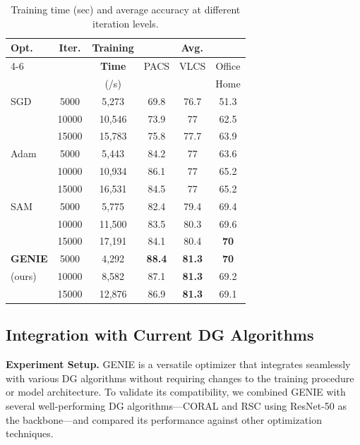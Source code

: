 \documentclass{article}
\theoremstyle{plain}
\theoremstyle{definition}
\theoremstyle{remark}
\begin{document}
\vskip -0.2in
\begin{table}[ht]
\vskip 0.1in
\caption{Training time (sec) and average accuracy at different iteration levels. }
\label{tab:iteration_opt}

\begin{center}
\begin{scriptsize}
\begin{sc}
\begin{tabular}{lc|c|ccc}
\toprule
\textbf{Opt.}& \textbf{Iter.}& \textbf{Training} & \multicolumn{3}{c}{\textbf{Avg.}}\\
\cmidrule(lr){4-6}& & \textbf{Time} & PACS & VLCS & Office\\ 
& & (/s) && & Home\\ 
\midrule
SGD     & 5000     & 5,273 & 69.8& 76.7& 51.3\\
        & 10000    & 10,546& 73.9& 77& 62.5\\
        & 15000    & 15,783& 75.8& 77.7& 63.9\\ 
\midrule
Adam    & 5000     & 5,443& 84.2& 77&  63.6\\
        & 10000    & 10,934& 86.1& 77& 65.2\\
        & 15000    & 16,531& 84.5& 77& 65.2\\ 
\midrule
SAM     & 5000     & 5,775& 82.4& 79.4& 69.4\\
        & 10000    & 11,500& 83.5& 80.3& 69.6\\
        & 15000    & 17,191& 84.1& 80.4& \textbf{70}\\ 
\midrule
\textbf{GENIE}   & 5000     & 4,292& \textbf{88.4}& \textbf{81.3}& \textbf{70}\\
        (ours)& 10000    & 8,582& 87.1& \textbf{81.3}& 69.2\\
        & 15000    & 12,876& 86.9& \textbf{81.3}& 69.1\\ 
\bottomrule
\end{tabular}
\end{sc}
\end{scriptsize}
\end{center}
\vskip -0.2in
\end{table}
\subsection{Integration with Current DG Algorithms}
\label{Sec-4: Integration with Current DG Algorithms}
\textbf{Experiment Setup.} GENIE is a versatile optimizer that integrates seamlessly with various DG algorithms without requiring changes to the training procedure or model architecture. To validate its compatibility, we combined GENIE with several well-performing DG algorithms—CORAL\cite{coral} and RSC\cite{rsc} using ResNet-50 as the backbone—and compared its performance against other optimization techniques.
\end{document}
